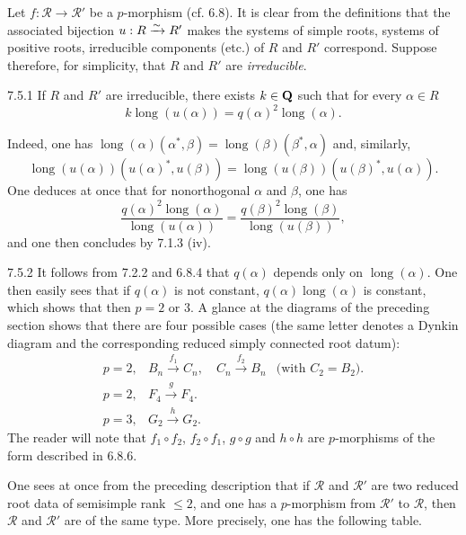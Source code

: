 Let $f:\mathcal R\to\mathcal R'$ be a $p$-morphism (cf. 6.8). It is clear from the definitions that the associated bijection $u:R\xrightarrow{\sim} R'$ makes the systems of simple roots, systems of positive roots, irreducible components (etc.) of $R$ and $R'$ correspond. Suppose therefore, for simplicity, that $R$ and $R'$ are \emph{irreducible}.
\begin{lemma}{7.5.1}\label{XXI.7.5.1}
If $R$ and $R'$ are irreducible, there exists $k\in\mathbf{Q}$ such that for every $\alpha\in R$
\[
k\operatorname{long}(u(\alpha))=q(\alpha)^2\operatorname{long}(\alpha).
\]
\end{lemma}
Indeed, one has $\operatorname{long}(\alpha)(\alpha^*,\beta)=\operatorname{long}(\beta)(\beta^*,\alpha)$ and, similarly,
\[
\operatorname{long}(u(\alpha))(u(\alpha)^*,u(\beta))
=\operatorname{long}(u(\beta))(u(\beta)^*,u(\alpha)).
\]
One deduces at once that for nonorthogonal $\alpha$ and $\beta$, one has
\[
\frac{q(\alpha)^2\operatorname{long}(\alpha)}{\operatorname{long}(u(\alpha))}
=\frac{q(\beta)^2\operatorname{long}(\beta)}{\operatorname{long}(u(\beta))},
\]
and one then concludes by 7.1.3 (iv).
\begin{remark}{7.5.2}\label{XXI.7.5.2}
It follows from 7.2.2 and 6.8.4 that $q(\alpha)$ depends only on $\operatorname{long}(\alpha)$. One then easily sees that if $q(\alpha)$ is not constant, $q(\alpha)\operatorname{long}(\alpha)$ is constant, which shows that then $p=2$ or $3$. A glance at the diagrams of the preceding section shows that there are four possible cases (the same letter denotes a Dynkin diagram and the corresponding reduced simply connected root datum):
\[
\begin{array}{lll}
p=2,&B_n\xrightarrow{f_1}C_n,\quad C_n\xrightarrow{f_2}B_n&\text{(with }C_2=B_2\text{).}\\
p=2,&F_4\xrightarrow{g}F_4.\\
p=3,&G_2\xrightarrow{h}G_2.
\end{array}
\]
The reader will note that $f_1\circ f_2$, $f_2\circ f_1$, $g\circ g$ and $h\circ h$ are $p$-morphisms of the form described in 6.8.6.
\end{remark}

 One sees at once from the preceding description that if $\mathcal R$ and $\mathcal R'$ are two reduced root data of semisimple rank $\leq2$, and one has a $p$-morphism from $\mathcal R'$ to $\mathcal R$, then $\mathcal R$ and $\mathcal R'$ are of the same type. More precisely, one has the following table.

